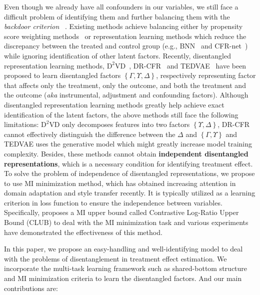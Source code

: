 \documentclass[sigconf]{acmart}
\begin{document}
Even though we already have all confounders in our variables, we still face a difficult problem of identifying them and further balancing them with the \textit{backdoor criterion} ~\citep{pearl2009causality}. Existing methods achieve balancing either by propensity score weighting methods~\citep{Austin2011AnIT} or representation learning methods which reduce the discrepancy between the treated and control group (e.g., BNN~\citep{Johansson2016LearningRF} and CFR-net~\citep{Shalit2017EstimatingIT}) while ignoring identification of other latent factors. Recently, disentangled representation learning methods, $\mathrm{D}^{2}$VD~\citep{Kuang2017TreatmentEE}, DR-CFR~\citep{Hassanpour2020LearningDR} and TEDVAE~\citep{Zhang2021TreatmentEE} have been proposed to learn disentangled factors $\left \{ \Gamma,\Upsilon,\Delta \right \}$, respectively representing factor that affects only the treatment, only the outcome, and both the treatment and the outcome (\textit{aka} instrumental, adjustment and confounding factors). Although disentangled representation learning methods greatly help achieve exact identification of the latent factors, the above methods still face the following limitations: $\mathrm{D}^{2}$VD only decomposes features into two factors $\left \{\Upsilon,\Delta \right \}$, DR-CFR cannot effectively distinguish the difference between the $\Delta$ and $\left \{ \Gamma,\Upsilon \right \}$ and TEDVAE uses the generative model which might greatly increase model training complexity. Besides, these methods cannot obtain \textbf{independent disentangled representations}, which is a necessary condition for identifying treatment effect. To solve the problem of independence of disentangled representations, we propose to use MI minimization \citep{Cheng2020CLUBAC,Chen2018IsolatingSO} method, which has obtained increasing attention in domain adaptation \cite{granger1994using} and style transfer \cite{kazemi2018unsupervised} recently. It is typically utilized as a learning criterion in loss function to ensure the independence between variables. Specifically, \citep{Cheng2020CLUBAC} proposes a MI upper bound called Contrastive Log-Ratio Upper Bound (CLUB) to deal with the MI minimization task and various experiments have demonstrated the effectiveness of this method. \par
In this paper, we propose an easy-handling and well-identifying model to deal with the problems of disentanglement in treatment effect estimation. We incorporate the multi-task learning framework such as shared-bottom structure and MI minimization criteria to learn the disentangled factors. And our main contributions are:
\end{document}
